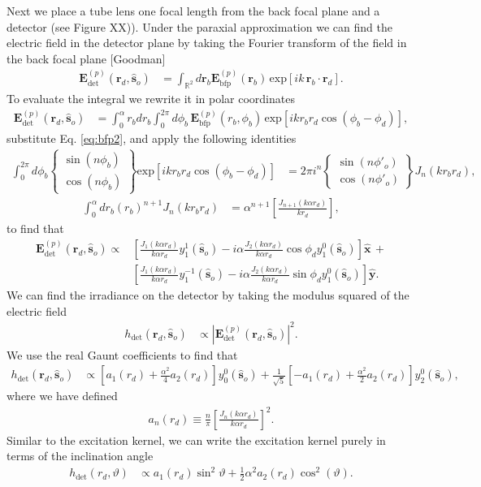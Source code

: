 \documentclass{osa-article}
\providecommand{\mb}[1]{\mathbf{#1}}
\providecommand{\so}{\mathbf{\hat{s}}_o}
\providecommand{\rb}{\mathbf{r}_b}
\providecommand{\rd}{\mathbf{r}_d}
\providecommand{\mh}[1]{\mathbf{\hat{#1}}}
\providecommand{\mbb}[1]{\mathbb{#1}}
\begin{document}
Next we place a tube lens one focal length from the back focal plane and a
detector (see Figure XX)). Under the paraxial approximation we can find the
electric field in the detector plane by taking the Fourier transform of the
field in the back focal plane [Goodman]
\begin{align}
  \mb{E}_{\text{det}}^{(p)}(\rd{}, \so{}) &= \int_{\mbb{R}^2}d\rb{} \mb{E}_{\text{bfp}}^{(p)}(\rb{})\, \text{exp}\left[ik\,\rb{}\cdot\rd{}\right].\label{eq:det1}
\end{align}
To evaluate the integral we rewrite it in polar coordinates
\begin{align}
\mb{E}_{\text{det}}^{(p)}(\rd{}, \so{}) &= \int_{0}^{\alpha}r_bdr_b\int_0^{2\pi} d\phi_b\, \mb{E}_{\text{bfp}}^{(p)}(r_b, \phi_b)\, \text{exp}\left[ikr_b r_d\cos(\phi_b - \phi_d)\right],
\end{align}
substitute Eq. \ref{eq:bfp2}, and apply the following identities
\begin{align}
  \int_0^{2\pi}d\phi_b
  \left\{\substack{
    \sin(n\phi_b)\\
    \cos(n\phi_b)
  }\right\}
  \text{exp}\left[ikr_br_d\cos(\phi_b - \phi_d)\right] &= 2\pi i^n
  \left\{\substack{
    \sin(n\phi'_o)\\
    \cos(n\phi'_o)
  }\right\}J_n(k r_br_d),
  \end{align}
  \begin{align}
  \int_0^{\alpha} dr_b (r_b)^{n+1}J_{n}(kr_br_d) &= \alpha^{n+1}\left[\frac{J_{n+1}(k\alpha r_d)}{k r_d}\right],
  \end{align}
to find that 
\begin{align}
  \mb{E}_{\text{det}}^{(p)}(\rd{}, \so{}) \propto &\left[\frac{J_1(k\alpha r_d)}{k\alpha r_d}y_1^1(\so{}) - i\alpha \frac{J_2(k\alpha r_d)}{k\alpha r_d}\cos\phi_d y_1^0(\so{})\right]\mh{x}\, + \nonumber \\& \left[\frac{J_1(k\alpha r_d)}{k\alpha r_d}y_1^{-1}(\so{}) - i\alpha \frac{J_2(k\alpha r_d)}{k\alpha r_d}\sin\phi_d y_1^0(\so{})\right]\mh{y}.
\end{align}
We can find the irradiance on the detector by taking the modulus squared of the
electric field
\begin{align}
  h_{\text{det}}(\rd{}, \so{}) &\propto |\mb{E}_{\text{det}}^{(p)}(\rd{}, \so{})|^2.
\end{align}
We use the real Gaunt coefficients to find that
\begin{align}
h_{\text{det}}(\rd{}, \so{}) &\propto \left[a_1( r_d) + \frac{\alpha^2}{4} a_2( r_d)\right]y_0^0(\so{}) + \frac{1}{\sqrt{5}}\left[- a_1( r_d) + \frac{\alpha^2}{2} a_2( r_d)\right]y_2^0(\so{}), \label{eq:detection}
\end{align}
where we have defined
\begin{align}
  a_n(r_d) \equiv \frac{n}{\pi}\left[\frac{J_n(k\alpha r_d)}{k\alpha r_d}\right]^2. 
\end{align}
Similar to the excitation kernel, we can write the excitation kernel purely in terms of
the inclination angle
\begin{align}
  h_{\text{det}}(r_d, \vartheta) &\propto a_1(r_d)\sin^2\vartheta + \frac{1}{2}\alpha^2a_2(r_d)\cos^2(\vartheta). 
\end{align}
\end{document}
